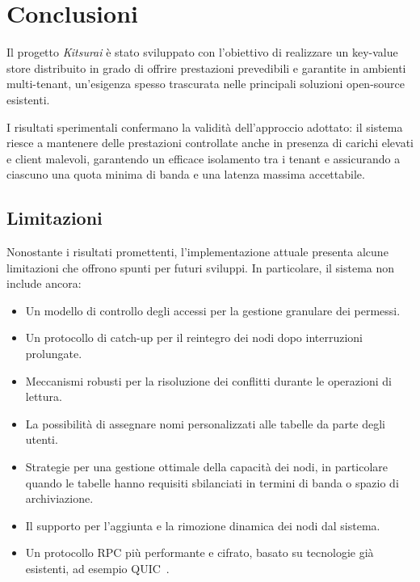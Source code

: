 \section{Conclusioni}
\label{sec:conclusioni}

Il progetto \textit{Kitsurai} è stato sviluppato con l'obiettivo di realizzare un key-value store distribuito in grado di offrire prestazioni prevedibili e garantite in ambienti multi-tenant, un'esigenza spesso trascurata nelle principali soluzioni open-source esistenti.

I risultati sperimentali confermano la validità dell'approccio adottato: il sistema riesce a mantenere delle prestazioni controllate anche in presenza di carichi elevati e client malevoli, garantendo un efficace isolamento tra i tenant e assicurando a ciascuno una quota minima di banda e una latenza massima accettabile.

\subsection{Limitazioni}
\label{subsec:limitazioni}

Nonostante i risultati promettenti, l'implementazione attuale presenta alcune limitazioni che offrono spunti per futuri sviluppi. In particolare, il sistema non include ancora:

\begin{itemize}
    \item Un modello di controllo degli accessi per la gestione granulare dei permessi.
    \item Un protocollo di catch-up per il reintegro dei nodi dopo interruzioni prolungate.
    \item Meccanismi robusti per la risoluzione dei conflitti durante le operazioni di lettura.
    \item La possibilità di assegnare nomi personalizzati alle tabelle da parte degli utenti.
    \item Strategie per una gestione ottimale della capacità dei nodi, in particolare quando le tabelle hanno requisiti sbilanciati in termini di banda o spazio di archiviazione.
    \item Il supporto per l'aggiunta e la rimozione dinamica dei nodi dal sistema.
    \item Un protocollo RPC più performante e cifrato, basato su tecnologie già esistenti, ad esempio QUIC~\cite{QUIC}.
\end{itemize}
